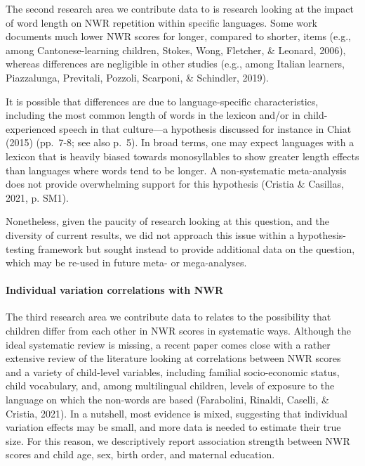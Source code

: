 \documentclass[
  american,
  ,man,floatsintext]{apa6}
\let\oldparagraph\paragraph
\renewcommand{\paragraph}[1]{\oldparagraph{#1}\mbox{}}
\begin{document}
The second research area we contribute data to is research looking at the impact of word length on NWR repetition within specific languages. Some work documents much lower NWR scores for longer, compared to shorter, items (e.g., among Cantonese-learning children, Stokes, Wong, Fletcher, \& Leonard, 2006), whereas differences are negligible in other studies (e.g., among Italian learners, Piazzalunga, Previtali, Pozzoli, Scarponi, \& Schindler, 2019).

It is possible that differences are due to language-specific characteristics, including the most common length of words in the lexicon and/or in child-experienced speech in that culture---a hypothesis discussed for instance in Chiat (2015) (pp.~7-8; see also p.~5). In broad terms, one may expect languages with a lexicon that is heavily biased towards monosyllables to show greater length effects than languages where words tend to be longer. A non-systematic meta-analysis does not provide overwhelming support for this hypothesis (Cristia \& Casillas, 2021, p. SM1).

Nonetheless, given the paucity of research looking at this question, and the diversity of current results, we did not approach this issue within a hypothesis-testing framework but sought instead to provide additional data on the question, which may be re-used in future meta- or mega-analyses.

\hypertarget{individual-variation-correlations-with-nwr}{%
\paragraph{Individual variation correlations with NWR}\label{individual-variation-correlations-with-nwr}}

The third research area we contribute data to relates to the possibility that children differ from each other in NWR scores in systematic ways. Although the ideal systematic review is missing, a recent paper comes close with a rather extensive review of the literature looking at correlations between NWR scores and a variety of child-level variables, including familial socio-economic status, child vocabulary, and, among multilingual children, levels of exposure to the language on which the non-words are based (Farabolini, Rinaldi, Caselli, \& Cristia, 2021). In a nutshell, most evidence is mixed, suggesting that individual variation effects may be small, and more data is needed to estimate their true size. For this reason, we descriptively report association strength between NWR scores and child age, sex, birth order, and maternal education.
\end{document}
